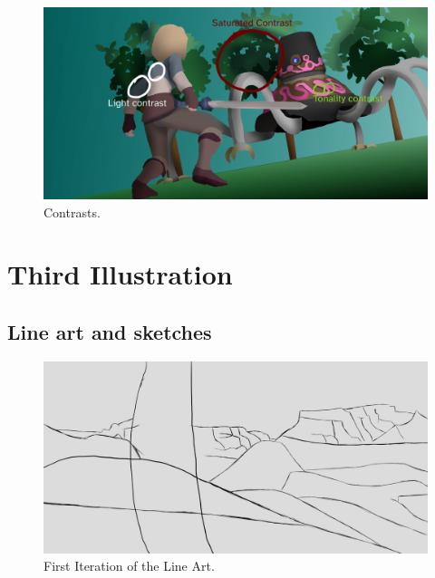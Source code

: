 \documentclass{cup-pan}
\begin{document}
            \begin{figure}[H]
                \includegraphics[width=\textwidth]{Imagenes/Fanart2/Analysis/contraste.png}
                \caption{Contrasts.}
            \end{figure}
\newpage
\newpage
\section{Third Illustration}

    \subsection{Line art and sketches}

        \begin{figure}[H]
            \includegraphics[width=\textwidth]{Fanart3/1_LineArt/I_Iteracion.png}
            \caption{First Iteration of the Line Art.}
        \end{figure}
\end{document}
